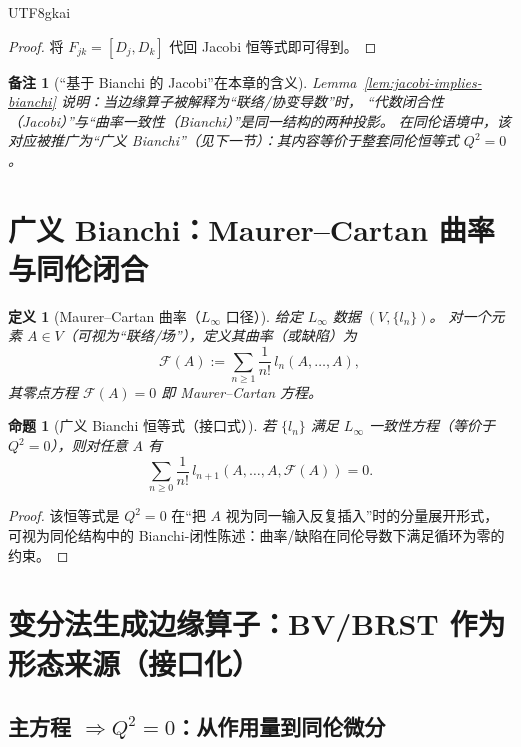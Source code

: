 \documentclass[12pt]{article}
\newtheorem{definition}{定义}[section]
\newtheorem{proposition}{命题}[section]
\newtheorem{remark}{备注}[section]
\begin{document}
\begin{CJK*}{UTF8}{gkai}
\begin{proof}
将 $F_{jk}=[D_j,D_k]$ 代回 Jacobi 恒等式即可得到。
\end{proof}

\begin{remark}[“基于 Bianchi 的 Jacobi”在本章的含义]
Lemma~\ref{lem:jacobi-implies-bianchi} 说明：当边缘算子被解释为“联络/协变导数”时，
“代数闭合性（Jacobi）”与“曲率一致性（Bianchi）”是同一结构的两种投影。
在同伦语境中，该对应被推广为“广义 Bianchi”（见下一节）：其内容等价于整套同伦恒等式 $Q^2=0$。
\end{remark}

\section{广义 Bianchi：Maurer--Cartan 曲率与同伦闭合}

\begin{definition}[Maurer--Cartan 曲率（$L_\infty$ 口径）]
给定 $L_\infty$ 数据 $(V,\{l_n\})$。
对一个元素 $A\in V$（可视为“联络/场”），定义其曲率（或缺陷）为
\[
  \mathcal{F}(A):=\sum_{n\ge 1}\frac{1}{n!}\,l_n(A,\dots,A),
\]
其零点方程 $\mathcal{F}(A)=0$ 即 Maurer--Cartan 方程。
\end{definition}

\begin{proposition}[广义 Bianchi 恒等式（接口式）]
\label{prop:generalized-bianchi}
若 $\{l_n\}$ 满足 $L_\infty$ 一致性方程（等价于 $Q^2=0$），则对任意 $A$ 有
\[
  \sum_{n\ge 0}\frac{1}{n!}\,l_{n+1}(A,\dots,A,\mathcal{F}(A))=0.
\]
\end{proposition}

\begin{proof}
该恒等式是 $Q^2=0$ 在“把 $A$ 视为同一输入反复插入”时的分量展开形式，
可视为同伦结构中的 Bianchi-闭性陈述：曲率/缺陷在同伦导数下满足循环为零的约束。
\end{proof}

\section{变分法生成边缘算子：BV/BRST 作为形态来源（接口化）}

\subsection{主方程 $\Rightarrow Q^2=0$：从作用量到同伦微分}


\end{CJK*}
\end{document}
